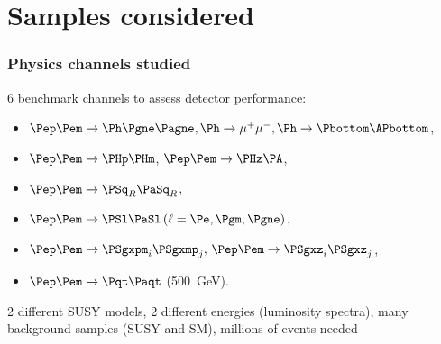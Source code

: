 \documentclass{beamer}
\begin{document}
\section{Samples considered}
\begin{frame}
\frametitle{Physics channels studied}
6 benchmark channels to assess detector performance:
\begin{itemize}
\item $\Pep\Pem \to \Ph \Pgne \Pagne, \Ph \to \mu^+\mu^-, \Ph \to
\Pbottom\APbottom$,
\item  $\Pep\Pem \to \PHp \PHm$, $\Pep\Pem \to \PHz \PA$, 
\item $\Pep\Pem \to \PSq_R \PaSq_R$, 
\item $\Pep\Pem \to \PSl \PaSl \,(\ell = \Pe,\Pgm,\Pgne)$, 
\item $\Pep\Pem \to \PSgxpm_i \PSgxmp_j,\, \Pep\Pem \to \PSgxz_i \PSgxz_j$,
\item  $\Pep\Pem \to \Pqt \Paqt$ (500~GeV).
\end{itemize}
2 different SUSY models, 2 different energies (luminosity spectra), many
background samples (SUSY and SM), millions of events needed
\end{frame}
\end{document}
